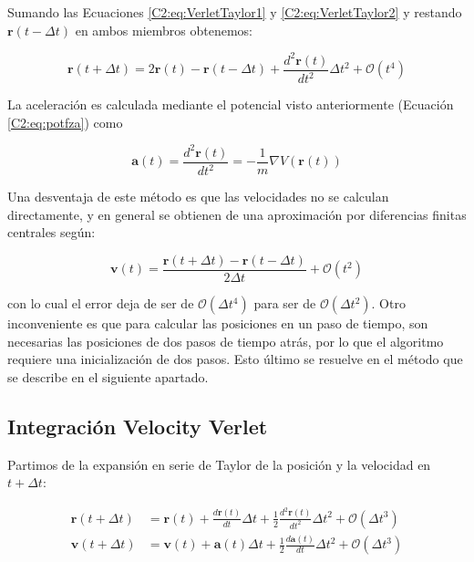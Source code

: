 Sumando las Ecuaciones \ref{C2:eq:VerletTaylor1} y \ref{C2:eq:VerletTaylor2} y restando $\mathbf{r}(t-\Delta{}t)$ en ambos miembros obtenemos:

\begin{equation}
\mathbf{r}(t+\Delta{}t) = 2\mathbf{r}(t) - \mathbf{r}(t-\Delta{}t) + \frac{d^{2}\mathbf{r}(t)}{dt^{2}} \Delta{}t^{2} + \mathcal{O}(t^{4})
\label{C2:eq:VerletPos}
\end{equation}

La aceleración es calculada mediante el potencial visto anteriormente (Ecuación \ref{C2:eq:potfza}) como

\begin{equation}
\mathbf{a}(t) = \frac{d^{2}\mathbf{r}(t)}{dt^{2}} = -\frac{1}{m}\nabla{}V(\mathbf{r}(t))
\end{equation}

Una desventaja de este método es que las velocidades no se calculan directamente, y en general se obtienen de una aproximación por diferencias finitas centrales según:

\begin{equation}
\mathbf{v}(t) = \frac{\mathbf{r}(t+\Delta{}t) - \mathbf{r}(t-\Delta{}t)}{2\Delta{}t} + \mathcal{O}(t^{2})
\end{equation}

con lo cual el error deja de ser de $\mathcal{O}(\Delta{}t^{4})$ para ser de $\mathcal{O}(\Delta{}t^{2})$. Otro inconveniente es que para calcular las posiciones en un paso de tiempo, son necesarias las posiciones de dos pasos de tiempo atrás, por lo que el algoritmo requiere una inicialización de dos pasos. Esto último se resuelve en el método que se describe en el siguiente apartado.

\subsection{Integración Velocity Verlet}
\label{S2_4_2}

Partimos de la expansión en serie de Taylor de la posición y la velocidad en $t+\Delta{}t$:

\begin{align}
\mathbf{r}(t+\Delta{}t) & = \mathbf{r}(t)+\frac{d\mathbf{r}(t)}{dt} \Delta{}t + \frac{1}{2} \frac{d^{2}\mathbf{r}(t)}{dt^{2}} \Delta{}t^{2} + \mathcal{O}(\Delta{}t^{3})
\label{C2:eq:VelVerletTaylor1} \\
\mathbf{v}(t+\Delta{}t) & = \mathbf{v}(t)+\mathbf{a}(t)\Delta{}t + \frac{1}{2}\frac{d\mathbf{a}(t)}{dt} \Delta{}t^{2} + \mathcal{O}(\Delta{}t^{3})
\label{C2:eq:VelVerletTaylor2}
\end{align}

